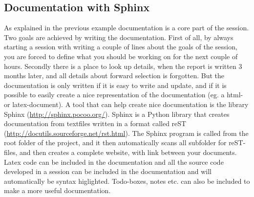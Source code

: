 \subsection{Documentation with Sphinx}
As explained in the previous example documentation is a core part of the session. Two goals are achieved by writing the documentation. First of all, by always starting a session with writing a couple of lines about the goals of the session, you are forced to define what you should be working on for the next couple of hours. Secondly there is a place to look up details, when the report is written 3 months later, and all details about forward selection is forgotten. But the documentation is only written if it is easy to write and update, and if it is possible to easily create a nice representation of the documentation (eg. a html- or latex-document). A tool that can help create nice documentation is the library Sphinx (\url{http://sphinx.pocoo.org/}). Sphinx is a Python library that creates documentation from textfiles written in a format called reST (\url{http://docutils.sourceforge.net/rst.html}). The Sphinx program is called from the root folder of the project, and it then automatically scans all subfolder for reST-files, and then creates a complete website, with link between your documents. Latex code can be included in the documentation and all the source code developed in a session can be included in the documentation and will automatically be syntax higlighted. Todo-boxes, notes etc. can also be included to make a more useful documentation.

